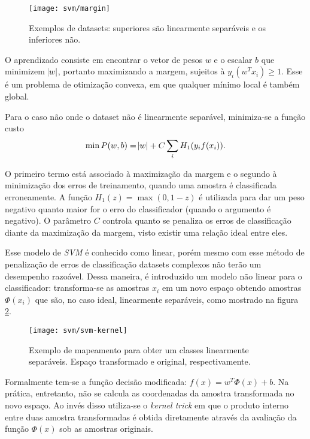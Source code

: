 \begin{figure}[h]
\centering
\texttt{[image: svm/margin]}
\caption{Exemplos de datasets: superiores são linearmente separáveis e os inferiores não.}
\label{fig:svm-margin}
\end{figure}

O aprendizado consiste em encontrar o vetor de pesos $w$ e o escalar $b$ que minimizem $\abs{w}$, portanto maximizando a margem, sujeitos à $y_i(w^T x_i) \geq 1$. Esse é um problema de otimização convexa, em que qualquer mínimo local é também global.

Para o caso não onde o dataset não é linearmente separável, minimiza-se a função custo 
\begin{equation*}
	\min P(w,b) = \abs{w} + C\sum_i H_1(y_i f(x_i)).
\end{equation*} 

O primeiro termo está associado à maximização da margem e o segundo à minimização dos erros de treinamento, quando uma amostra é classificada erroneamente. A função $H_1(z)=\max(0,1-z)$ é utilizada para dar um peso negativo quanto maior for o erro do classificador (quando o argumento é negativo). O parâmetro $C$ controla quanto se penaliza os erros de classificação diante da maximização da margem, visto existir uma relação ideal entre eles.

Esse modelo de \textit{SVM} é conhecido como linear, porém mesmo com esse método de penalização de erros de classificação datasets complexos não terão um desempenho razoável. Dessa maneira, é introduzido um modelo não linear para o classificador: transforma-se as amostras $x_i$ em um novo espaço obtendo amostras $\Phi(x_i)$ que são, no caso ideal, linearmente separáveis, como mostrado na figura \ref{fig:svm-kernel}.

\begin{figure}[h]
\centering
\texttt{[image: svm/svm-kernel]}
\caption{Exemplo de mapeamento para obter um classes linearmente separáveis. Espaço transformado e original, respectivamente.}
\label{fig:svm-kernel}
\end{figure}

Formalmente tem-se a função decisão modificada: $f(x)=w^T \Phi(x) +b$.  Na prática, entretanto, não se calcula as coordenadas da amostra transformada no novo espaço. Ao invés disso utiliza-se o \textit{kernel trick} em que o produto interno entre duas amostra transformadas é obtida diretamente através da avaliação da função $\Phi(x)$ sob as amostras originais.

